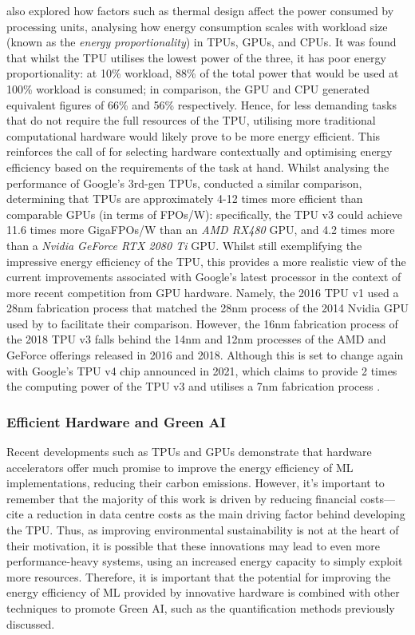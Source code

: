 \documentclass[a4paper, 12pt]{article}
\begin{document}
    \citet{jouppi-2017} also explored how factors such as thermal design affect the power consumed by processing units, analysing how energy consumption scales with workload size (known as the \emph{energy proportionality}) in TPUs, GPUs, and CPUs. It was found that whilst the TPU utilises the lowest power of the three, it has poor energy proportionality: at 10\% workload, 88\% of the total power that would be used at 100\% workload is consumed; in comparison, the GPU and CPU generated equivalent figures of 66\% and 56\% respectively. Hence, for less demanding tasks that do not require the full resources of the TPU, utilising more traditional computational hardware would likely prove to be more energy efficient. This reinforces the call of \citet{lacoste-2019} for selecting hardware contextually and optimising energy efficiency based on the requirements of the task at hand. Whilst analysing the performance of Google's 3rd-gen TPUs, \citet{lacoste-2019} conducted a similar comparison, determining that TPUs are approximately 4-12 times more efficient than comparable GPUs (in terms of FPOs/W): specifically, the TPU v3 could achieve 11.6 times more GigaFPOs/W than an \emph{AMD RX480} GPU, and 4.2 times more than a \emph{Nvidia GeForce RTX 2080 Ti} GPU. Whilst still exemplifying the impressive energy efficiency of the TPU, this provides a more realistic view of the current improvements associated with Google's latest processor in the context of more recent competition from GPU hardware. Namely, the 2016 TPU v1 used a 28nm fabrication process that matched the 28nm process of the 2014 Nvidia GPU used by \citet{jouppi-2017} to facilitate their comparison. However, the 16nm fabrication process of the 2018 TPU v3 falls behind the 14nm and 12nm processes of the AMD and GeForce offerings released in 2016 and 2018. Although this is set to change again with Google's TPU v4 chip announced in 2021, which claims to provide 2 times the computing power of the TPU v3 and utilises a 7nm fabrication process \citep{wang-selvan-2021}.

    \subsubsection{Efficient Hardware and Green AI}

    Recent developments such as TPUs and GPUs demonstrate that hardware accelerators offer much promise to improve the energy efficiency of ML implementations, reducing their carbon emissions. However, it's important to remember that the majority of this work is driven by reducing financial costs---\citet{jouppi-2017} cite a reduction in data centre costs as the main driving factor behind developing the TPU. Thus, as improving environmental sustainability is not at the heart of their motivation, it is possible that these innovations may lead to even more performance-heavy systems, using an increased energy capacity to simply exploit more resources. Therefore, it is important that the potential for improving the energy efficiency of ML provided by innovative hardware is combined with other techniques to promote Green AI, such as the quantification methods previously discussed.
\end{document}
